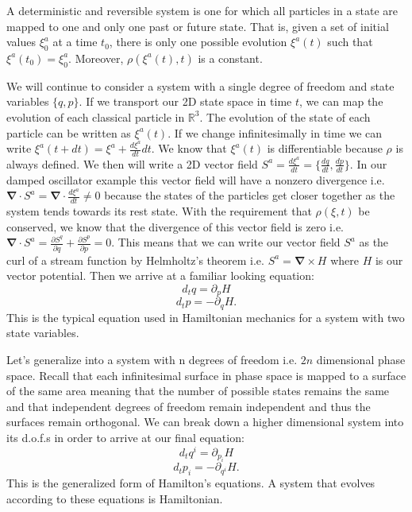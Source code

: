 \documentclass{article}
\begin{document}
\begin{defn}
	A deterministic and reversible system is one for which all particles in a state are mapped to one and only one past or future state. That is, given a set of initial values $\xi^a_0$ at a time $t_0$, there is only one possible evolution $\xi^a(t)$ such that $\xi^a(t_0) = \xi^a_0$. Moreover, $\rho(\xi^a(t), t)$ is a constant.
\end{defn}

	We will continue to consider a system with a single degree of freedom and state variables $\{q,p \}$. If we transport our 2D state space in time $t$, we can map the evolution of each classical particle in $\mathbb{R}^3$. The evolution of the state of each particle can be written as $\xi^a(t)$. If we change infinitesimally in time we can write $\xi^a(t + dt) = \xi^a + \frac{d\xi^a}{dt}dt$. We know that $\xi^a(t)$ is differentiable because $\rho$ is always defined. We then will write a 2D vector field $S^a =\frac{d\xi^a}{dt} = \{\frac{dq}{dt},\frac{dp}{dt} \}$. In our damped oscillator example this vector field will have a nonzero divergence i.e. $\mathbf{\nabla} \cdot S^a =\mathbf{\nabla} \cdot \frac{d\xi^a}{dt} \neq 0$ because the states of the particles get closer together as the system tends towards its rest state. With the requirement that $\rho(\xi,t)$ be conserved, we know that the divergence of this vector field is zero i.e. $\mathbf{\nabla} \cdot S^a = \frac{\partial S^q}{\partial q} + \frac{\partial S^p}{\partial p} = 0$. This means that we can write our vector field $S^a$ as the curl of a stream function by Helmholtz's theorem i.e. $S^a = \mathbf{\nabla} \times H$ where $H$ is our vector potential. Then we arrive at a familiar looking equation: $$d_t q = \partial _{p} H$$ $$d_t p = -\partial _q H.$$ This is the typical equation used in Hamiltonian mechanics for a system with two state variables.
	
	Let's generalize into a system with n degrees of freedom i.e. $2n$ dimensional phase space. Recall that each infinitesimal surface in phase space is mapped to a surface of the same area meaning that the number of possible states remains the same and that independent degrees of freedom remain independent and thus the surfaces remain orthogonal. We can break down a higher dimensional system into its d.o.f.s in order to arrive at our final equation: $$d_tq^i = \partial_{p_i}H$$ $$d_tp_i = -\partial_{q^i}H.$$ This is the generalized form of Hamilton's equations. A system that evolves according to these equations is Hamiltonian.
\end{document}
